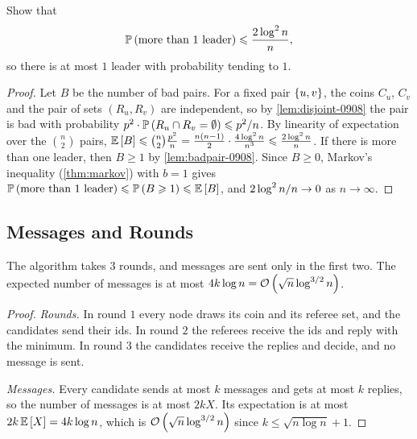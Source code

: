 \begin{exercisebox}
\begin{exercise}\label{ex:atmost-0908}\label{thm:leader-atmost-0908}
    Show that
    \[\operatorname{\mathbb{P}}\left(\text{more than $1$ leader}\right) \leqslant \frac{2 \log^2 n}{n},\]
    so there is at most $1$ leader with probability tending to $1$.
\end{exercise}
\tcblower
\begin{proof}
    Let $B$ be the number of bad pairs. For a fixed pair $\left\lbrace u,v\right\rbrace$, the coins $C_u$, $C_v$ and the
    pair of sets $(R_u, R_v)$ are independent, so by \cref{lem:disjoint-0908} the pair is bad with
    probability $p^2 \cdot \operatorname{\mathbb{P}}\left(R_u \cap R_v = \emptyset\right) \leqslant p^2/n$. By linearity of
    expectation over the $\binom{n}{2}$ pairs,
    $\operatorname{\mathbb{E}}\left[B\right] \leqslant \binom{n}{2} \frac{p^2}{n} = \frac{n(n-1)}{2} \cdot \frac{4 \log^2 n}{n^3}
        \leqslant \frac{2 \log^2 n}{n}$.
    If there is more than one leader, then $B \geq 1$ by \cref{lem:badpair-0908}. Since $B \geq 0$,
    Markov's inequality (\cref{thm:markov}) with $b = 1$ gives
    $\operatorname{\mathbb{P}}\left(\text{more than $1$ leader}\right) \leqslant \operatorname{\mathbb{P}}\left(B \geqslant 1\right) \leqslant \operatorname{\mathbb{E}}\left[B\right]$, and
    $2 \log^2 n/n \to 0$ as $n \to \infty$.
\end{proof}
\end{exercisebox}

\subsection{Messages and Rounds}

\begin{theorem}\label{thm:complexity-0908}
    The algorithm takes $3$ rounds, and messages are sent only in the first two. The expected number
    of messages is at most $4 k \log n = \mathcal{O}\left(\sqrt{n} \log^{3/2} n\right)$.
\end{theorem}

\begin{proof}
    \emph{Rounds.} In round $1$ every node draws its coin and its referee set, and the candidates
    send their ids. In round $2$ the referees receive the ids and reply with the minimum. In round
    $3$ the candidates receive the replies and decide, and no message is sent.

    \emph{Messages.} Every candidate sends at most $k$ messages and gets at most $k$ replies, so the
    number of messages is at most $2kX$. Its expectation is at most $2k \operatorname{\mathbb{E}}\left[X\right] = 4 k \log n$,
    which is $\mathcal{O}\left(\sqrt{n} \log^{3/2} n\right)$ since $k \leq \sqrt{n \log n} + 1$.
\end{proof}

